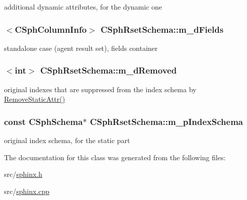 additional dynamic attributes, for the dynamic one 

\hypertarget{classCSphRsetSchema_a562e907b9c4509062bf950f4ef1cf1a8}{
\subsubsection[{m\-\_\-d\-Fields}]{$<${\bf C\-Sph\-Column\-Info}$>$ C\-Sph\-Rset\-Schema\-::m\-\_\-d\-Fields}}\label{classCSphRsetSchema_a562e907b9c4509062bf950f4ef1cf1a8}


standalone case (agent result set), fields container 

\hypertarget{classCSphRsetSchema_a16e7a96c479fe6c94dcebddfaa00fd7a}{
\subsubsection[{m\-\_\-d\-Removed}]{$<${\bf int}$>$ C\-Sph\-Rset\-Schema\-::m\-\_\-d\-Removed\hspace{0.3cm}{\ttfamily [protected]}}}\label{classCSphRsetSchema_a16e7a96c479fe6c94dcebddfaa00fd7a}


original indexes that are suppressed from the index schema by \hyperlink{classCSphRsetSchema_ae85ee414cc877885d91ad644fc4d98c6}{Remove\-Static\-Attr()} 

\hypertarget{classCSphRsetSchema_a4d588d85d429ecc0db51a8982836008f}{
\subsubsection[{m\-\_\-p\-Index\-Schema}]{\setlength{\rightskip}{0pt plus 5cm}const {\bf C\-Sph\-Schema}$\ast$ C\-Sph\-Rset\-Schema\-::m\-\_\-p\-Index\-Schema\hspace{0.3cm}{\ttfamily [protected]}}}\label{classCSphRsetSchema_a4d588d85d429ecc0db51a8982836008f}


original index schema, for the static part 



The documentation for this class was generated from the following files\-:\begin{DoxyCompactItemize}
\item 
src/\hyperlink{sphinx_8h}{sphinx.\-h}\item 
src/\hyperlink{sphinx_8cpp}{sphinx.\-cpp}\end{DoxyCompactItemize}
